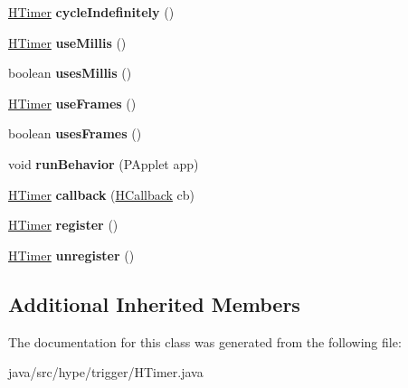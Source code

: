 \begin{DoxyCompactItemize}
\item 
\hypertarget{classhype_1_1trigger_1_1_h_timer_aba4d154cef29ffe50e6e06735c8697bf}{\hyperlink{classhype_1_1trigger_1_1_h_timer}{H\-Timer} {\bfseries cycle\-Indefinitely} ()}\label{classhype_1_1trigger_1_1_h_timer_aba4d154cef29ffe50e6e06735c8697bf}

\item 
\hypertarget{classhype_1_1trigger_1_1_h_timer_a64e6f685c73eae6455b62f5df34c5e70}{\hyperlink{classhype_1_1trigger_1_1_h_timer}{H\-Timer} {\bfseries use\-Millis} ()}\label{classhype_1_1trigger_1_1_h_timer_a64e6f685c73eae6455b62f5df34c5e70}

\item 
\hypertarget{classhype_1_1trigger_1_1_h_timer_a93639f4424715bdf47f3cd2fbc03dc45}{boolean {\bfseries uses\-Millis} ()}\label{classhype_1_1trigger_1_1_h_timer_a93639f4424715bdf47f3cd2fbc03dc45}

\item 
\hypertarget{classhype_1_1trigger_1_1_h_timer_afc5dc40c9f10802bc39b4eeb5cebec62}{\hyperlink{classhype_1_1trigger_1_1_h_timer}{H\-Timer} {\bfseries use\-Frames} ()}\label{classhype_1_1trigger_1_1_h_timer_afc5dc40c9f10802bc39b4eeb5cebec62}

\item 
\hypertarget{classhype_1_1trigger_1_1_h_timer_abd2ee4b5e2c1636f2363e02102eb8d15}{boolean {\bfseries uses\-Frames} ()}\label{classhype_1_1trigger_1_1_h_timer_abd2ee4b5e2c1636f2363e02102eb8d15}

\item 
\hypertarget{classhype_1_1trigger_1_1_h_timer_acd4c0d8417fcb4eae4599d46d9f9d7a1}{void {\bfseries run\-Behavior} (P\-Applet app)}\label{classhype_1_1trigger_1_1_h_timer_acd4c0d8417fcb4eae4599d46d9f9d7a1}

\item 
\hypertarget{classhype_1_1trigger_1_1_h_timer_a92734f8e6faabf2227f412fb8a47a7ec}{\hyperlink{classhype_1_1trigger_1_1_h_timer}{H\-Timer} {\bfseries callback} (\hyperlink{interfacehype_1_1interfaces_1_1_h_callback}{H\-Callback} cb)}\label{classhype_1_1trigger_1_1_h_timer_a92734f8e6faabf2227f412fb8a47a7ec}

\item 
\hypertarget{classhype_1_1trigger_1_1_h_timer_a0b10b523b75cab9f449dc881f4842c5c}{\hyperlink{classhype_1_1trigger_1_1_h_timer}{H\-Timer} {\bfseries register} ()}\label{classhype_1_1trigger_1_1_h_timer_a0b10b523b75cab9f449dc881f4842c5c}

\item 
\hypertarget{classhype_1_1trigger_1_1_h_timer_aaf113165ef2c2ee23d410916b297c008}{\hyperlink{classhype_1_1trigger_1_1_h_timer}{H\-Timer} {\bfseries unregister} ()}\label{classhype_1_1trigger_1_1_h_timer_aaf113165ef2c2ee23d410916b297c008}

\end{DoxyCompactItemize}
\subsection*{Additional Inherited Members}


The documentation for this class was generated from the following file\-:\begin{DoxyCompactItemize}
\item 
java/src/hype/trigger/H\-Timer.\-java\end{DoxyCompactItemize}
